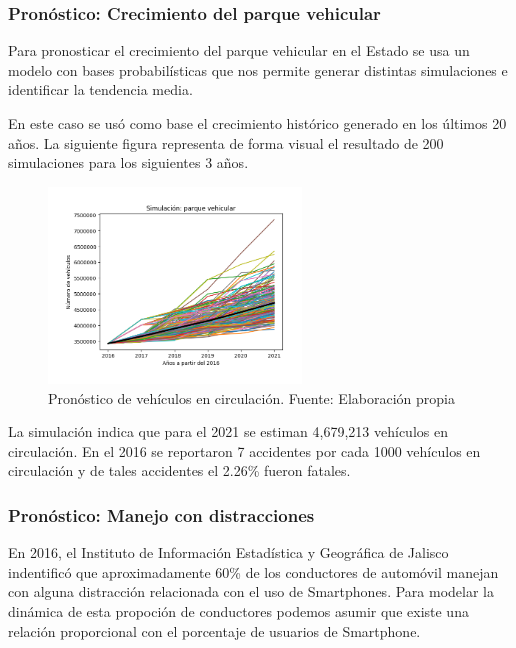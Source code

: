 \documentclass{article}
\begin{document}
\subsubsection{Pronóstico: Crecimiento del parque vehicular}

Para pronosticar el crecimiento del parque vehicular en el Estado se usa
un modelo con bases probabilísticas que nos permite generar distintas
simulaciones e identificar la tendencia media.

En este caso se usó como base el crecimiento histórico generado en los
últimos 20 años. La siguiente figura representa de forma visual el
resultado de 200 simulaciones para los siguientes 3 años.

	\begin{figure}[H]\centering
	\includegraphics[width=0.6\textwidth]{resources/img/vehicle_forecast_img.png}
	\caption{\label{fig:vehicle_forecast} Pronóstico de vehículos en circulación. Fuente: Elaboración propia}
    \end{figure}

La simulación indica que para el 2021 se estiman 4,679,213 vehículos en circulación.
En el 2016 se reportaron 7 accidentes por cada 1000 vehículos en circulación y de tales accidentes el
2.26\% fueron fatales.


\subsubsection{Pronóstico: Manejo con distracciones}

En 2016, el Instituto de Información Estadística y Geográfica de Jalisco indentificó que
aproximadamente 60\% de los conductores de automóvil manejan con alguna distracción
relacionada con el uso de Smartphones. Para modelar la dinámica de esta propoción de conductores podemos
asumir que existe una relación proporcional con el porcentaje de usuarios de Smartphone.
\end{document}
